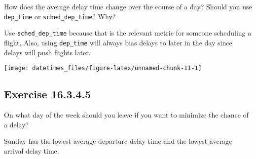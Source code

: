 \documentclass[]{book}
\newenvironment{Shaded}{\begin{snugshade}}{\end{snugshade}}
\newcommand{\CommentTok}[1]{\textcolor[rgb]{0.56,0.35,0.01}{\textit{#1}}}
\newcommand{\DataTypeTok}[1]{\textcolor[rgb]{0.13,0.29,0.53}{#1}}
\newcommand{\KeywordTok}[1]{\textcolor[rgb]{0.13,0.29,0.53}{\textbf{#1}}}
\newcommand{\NormalTok}[1]{#1}
\newcommand{\OperatorTok}[1]{\textcolor[rgb]{0.81,0.36,0.00}{\textbf{#1}}}
\newcommand{\StringTok}[1]{\textcolor[rgb]{0.31,0.60,0.02}{#1}}
\theoremstyle{plain}
\theoremstyle{remark}
\begin{document}
How does the average delay time change over the course of a day? Should
you use \texttt{dep\_time} or \texttt{sched\_dep\_time}? Why?

Use \texttt{sched\_dep\_time} because that is the relevant metric for
someone scheduling a flight. Also, using \texttt{dep\_time} will always
bias delays to later in the day since delays will push flights later.

\begin{Shaded}
\end{Shaded}

\begin{center}\texttt{[image: datetimes\_files/figure-latex/unnamed-chunk-11-1]} \end{center}

\hypertarget{exercise-16.3.4.5}{%
\subsection*{\texorpdfstring{Exercise
{16.3.4.5}}{Exercise 16.3.4.5}}\label{exercise-16.3.4.5}}

On what day of the week should you leave if you want to minimize the
chance of a delay?

Sunday has the lowest average departure delay time and the lowest
average arrival delay time.
\end{document}
